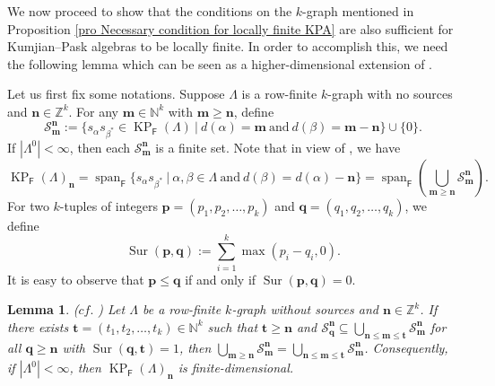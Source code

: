 \documentclass[a4paper,reqno,12pt]{amsart}
\numberwithin{equation}{section}
\newtheorem{lem}[thm]{Lemma}
\theoremstyle{definition}
\theoremstyle{remark}
\newcommand{\lspan}{\operatorname{span}}
\newcommand{\sur}{\operatorname{Sur}}
\newcommand{\KP}{\operatorname{KP}}
\newcommand{\N}{\mathbf{n}}
\newcommand{\M}{\mathbf{m}}
\newcommand{\bP}{\mathbf{p}}
\newcommand{\Q}{\mathbf{q}}
\newcommand{\bT}{\mathbf{t}}
\newcommand{\mS}{\mathcal{S}}
\begin{document}
We now proceed to show that the conditions on the $k$-graph mentioned in Proposition \ref{pro Necessary condition for locally finite KPA} are also sufficient for Kumjian--Pask algebras to be locally finite. In order to accomplish this, we need the following lemma which can be seen as a higher-dimensional extension of \cite[Lemma 1.3]{AAS}. 

Let us first fix some notations. Suppose $\Lambda$ is a row-finite $k$-graph with no sources and $\N\in \mathbb{Z}^k$. For any $\M\in \mathbb{N}^k$ with $\M\ge \N$, define \[\mS_\M^\N:=\{s_\alpha s_{\beta^*}\in \KP_\mathsf{F}(\Lambda)~|~d(\alpha)=\M~\text{and}~d(\beta)=\M-\N\}\cup \{0\}.\] If $|\Lambda^0|< \infty$, then each $\mS_\M^\N$ is a finite set. Note that in view of \cite[(3.3)]{Pino}, we have 
\begin{equation}\label{eq the span}
\KP_\mathsf{F}(\Lambda)_\N=\lspan_\mathsf{F} \{s_\alpha s_{\beta^*}~|~\alpha,\beta\in \Lambda~\text{and}~d(\beta)=d(\alpha)-\N\}=\lspan_\mathsf{F}\left(\displaystyle{\bigcup_{\M\ge \N}}\mS_\M^\N\right).
\end{equation}
For two $k$-tuples of integers $\bP=(p_1,p_2,\ldots,p_k)$ and $\Q=(q_1,q_2,\ldots,q_k)$, we define \[\sur(\bP,\Q):=\displaystyle{\sum_{i=1}^{k}}\max(p_i-q_i,0).\] It is easy to observe that $\bP\le \Q$ if and only if $\sur(\bP,\Q)=0$. 
\begin{lem}\label{lem the absorbing lemma}
\textup{($cf.$ \cite[Lemma 1.3]{AAS})} Let $\Lambda$ be a row-finite $k$-graph without sources and $\N\in \mathbb{Z}^k$. If there exists $\bT=(t_1,t_2,\ldots,t_k)\in \mathbb{N}^k$ such that $\bT\ge \N$ and $\mS_\Q^\N\subseteq \displaystyle{\bigcup_{\N\le \M\le \bT}}\mS_\M^\N$ for all $\Q\ge \N$ with $\sur(\Q,\bT)=1$, then $\displaystyle{\bigcup_{\M\ge \N}}\mS_\M^\N=\displaystyle{\bigcup_{\N\le \M\le \bT}} \mS_\M^\N$. Consequently, if $|\Lambda^0|< \infty$, then $\KP_\mathsf{F}(\Lambda)_\N$ is finite-dimensional. 
\end{lem}
\end{document}
